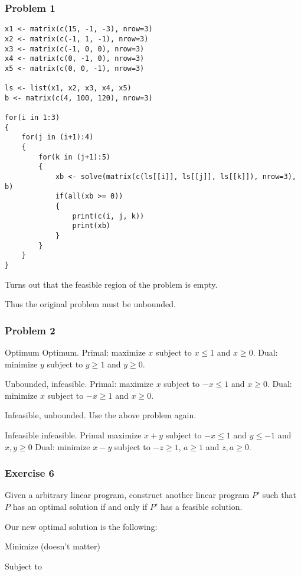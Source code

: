 \documentclass[11pt]{article}
\begin{document}
\subsubsection{Problem 1}
\label{sec:org63d89aa}
\begin{verbatim}
x1 <- matrix(c(15, -1, -3), nrow=3)
x2 <- matrix(c(-1, 1, -1), nrow=3)
x3 <- matrix(c(-1, 0, 0), nrow=3)
x4 <- matrix(c(0, -1, 0), nrow=3)
x5 <- matrix(c(0, 0, -1), nrow=3)

ls <- list(x1, x2, x3, x4, x5)
b <- matrix(c(4, 100, 120), nrow=3)

for(i in 1:3)
{
    for(j in (i+1):4)
    {
        for(k in (j+1):5)
        {
            xb <- solve(matrix(c(ls[[i]], ls[[j]], ls[[k]]), nrow=3), b)
            if(all(xb >= 0))
            {
                print(c(i, j, k))
                print(xb)
            }
        }
    }
}
\end{verbatim}

Turns out that the feasible region of the problem is empty.

Thus the original problem must be unbounded.
\subsubsection{Problem 2}
\label{sec:org444af90}
Optimum Optimum. Primal: maximize \(x\) subject to \(x \le 1\) and \(x \ge 0\).
Dual: minimize \(y\) subject to \(y \ge 1\) and \(y \ge 0\).

Unbounded, infeasible. Primal: maximize \(x\) subject to \(-x \le 1\) and \(x \ge
    0\). Dual: minimize \(x\) subject to \(-x \ge 1\) and \(x \ge 0\).

Infeasible, unbounded. Use the above problem again.

Infeasible infeasible. Primal maximize \(x + y\) subject to \(-x \le 1\) and \(y
    \le -1\) and \(x, y \ge 0\) Dual: minimize \(x - y\) subject to \(-z \ge 1\), \(a
    \ge 1\) and \(z, a \ge 0\).
\subsubsection{Exercise 6}
\label{sec:orge907d64}
Given a arbitrary linear program, construct another linear program \(P'\) such
that \(P\) has an optimal solution if and only if \(P'\) has a feasible solution.

Our new optimal solution is the following:

Minimize (doesn't matter)

Subject to 
\end{document}
